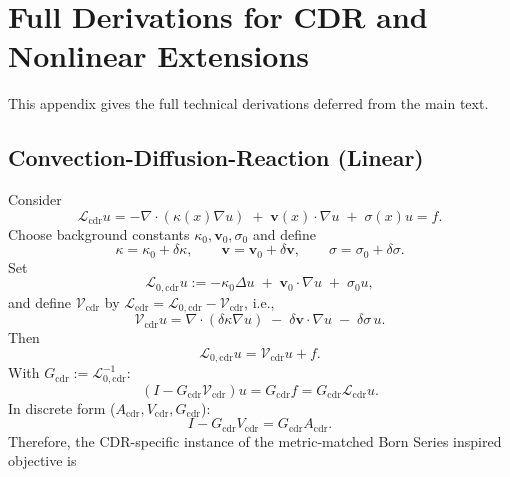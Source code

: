 \documentclass{article}
\theoremstyle{plain}
\theoremstyle{remark}
\begin{document}
\section{Full Derivations for CDR and Nonlinear Extensions}
\label{app:cdr_nl_full}
This appendix gives the full technical derivations deferred from the main text.

\subsection{Convection-Diffusion-Reaction (Linear)}
Consider
\begin{equation}
\mathcal{L}_{\mathrm{cdr}}u
=
-\nabla\cdot(\kappa(x)\nabla u)
\;+\;
\mathbf{v}(x)\cdot\nabla u
\;+\;
\sigma(x)u
=
f.
\label{eq:cdr_pde}
\end{equation}
Choose background constants $\kappa_0,\mathbf{v}_0,\sigma_0$ and define
\begin{equation}
\kappa=\kappa_0+\delta\kappa,\qquad
\mathbf{v}=\mathbf{v}_0+\delta\mathbf{v},\qquad
\sigma=\sigma_0+\delta\sigma.
\end{equation}
Set
\begin{equation}
\mathcal{L}_{0,\mathrm{cdr}}u
:=
-\kappa_0\Delta u
\;+\;
\mathbf{v}_0\cdot\nabla u
\;+\;
\sigma_0 u,
\label{eq:cdr_L0}
\end{equation}
and define $\mathcal{V}_{\mathrm{cdr}}$ by $\mathcal{L}_{\mathrm{cdr}}=\mathcal{L}_{0,\mathrm{cdr}}-\mathcal{V}_{\mathrm{cdr}}$, i.e.,
\begin{equation}
\mathcal{V}_{\mathrm{cdr}}u
=
\nabla\cdot(\delta\kappa\nabla u)
\;-\;
\delta\mathbf{v}\cdot\nabla u
\;-\;
\delta\sigma\,u.
\label{eq:cdr_V}
\end{equation}
Then
\begin{equation}
\mathcal{L}_{0,\mathrm{cdr}}u
=
\mathcal{V}_{\mathrm{cdr}}u+f.
\end{equation}
With $G_{\mathrm{cdr}}:=\mathcal{L}_{0,\mathrm{cdr}}^{-1}$:
\begin{equation}
(I-G_{\mathrm{cdr}}\mathcal{V}_{\mathrm{cdr}})u
=
G_{\mathrm{cdr}}f
=
G_{\mathrm{cdr}}\mathcal{L}_{\mathrm{cdr}}u.
\label{eq:cdr_integral}
\end{equation}
In discrete form ($A_{\mathrm{cdr}},V_{\mathrm{cdr}},G_{\mathrm{cdr}}$):
\begin{equation}
I-G_{\mathrm{cdr}}V_{\mathrm{cdr}}
=
G_{\mathrm{cdr}}A_{\mathrm{cdr}}.
\label{eq:cdr_identity}
\end{equation}
Therefore, the CDR-specific instance of the metric-matched Born Series inspired objective is
\end{document}
